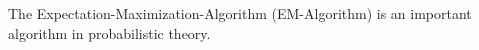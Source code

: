 The Expectation-Maximization-Algorithm (EM-Algorithm) is an important algorithm in probabilistic theory.